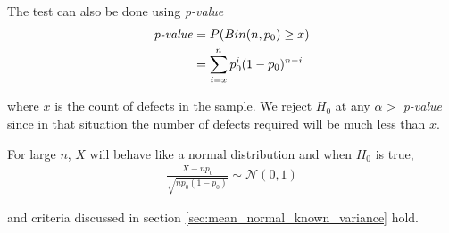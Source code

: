 \documentclass[../probability-notes.tex]{subfiles}
\begin{document}
    The test can also be done using \emph{p-value}
    \begin{align*}
        \text{\emph{p-value}} &= P(Bin(n, p_{0}) \geq x)\\
        &= \sum_{i=x}^{n}p_{0}^{i}(1-p_{0})^{n-i}
    \end{align*}

    where $x$ is the count of defects in the sample. We reject $H_{0}$ at any $\alpha >$ \emph{p-value} since in that situation the number of defects required will be much less than $x$.

    For large $n$, $X$ will behave like a normal distribution and when $H_{0}$ is true,
    \begin{align*}
        \frac{X - np_{0}}{\sqrt{np_{0}(1-p_{0})}} \sim \mathcal{N}(0,1)
    \end{align*}

    and criteria discussed in section \ref{sec:mean_normal_known_variance} hold.\newline
\end{document}
